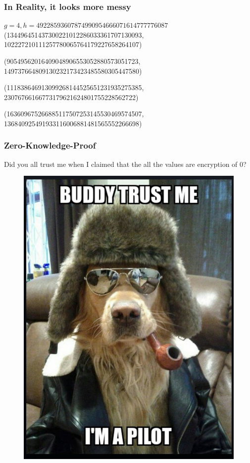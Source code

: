 \documentclass{beamer}
\begin{document}
\begin{frame}
\frametitle{In Reality, it looks more messy}
$g = 4, h = 49228593607874990954666071614777776087$
 (134496451437300221012286033361707130093, 102227210111257780065764179227658264107)
 
 (90549562016409048906553052880573051723, 149737664809130232173423485580305447580)
  
 (111838646913099268144525651231935275385, 23076766166773179621624801755228562722) 
 
 (163609675266885117507253145530469574507, 136840925491933116006881481565552266698)
\end{frame}



\begin{frame}
\frametitle{Zero-Knowledge-Proof}
{Did you all trust me when I claimed that the all the values are encryption of 0?}
\begin{figure}
\includegraphics[scale=0.30]{pilot.png}
\end{figure}

\end{frame}
\end{document}
